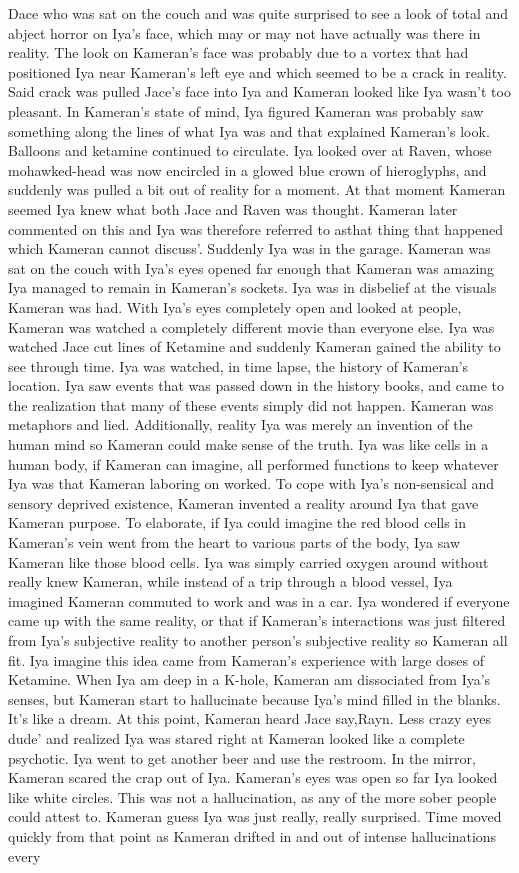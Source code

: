 \documentclass[12pt]{book}
\begin{document}
Dace who was sat on the couch and was quite surprised to see a look of total and abject horror on Iya's face, which may or may not have actually was there in reality. The look on Kameran's face was probably due to a vortex that had positioned Iya near Kameran's left eye and which seemed to be a crack in reality. Said crack was pulled Jace's face into Iya and Kameran looked like Iya wasn't too pleasant. In Kameran's state of mind, Iya figured Kameran was probably saw something along the lines of what Iya was and that explained Kameran's look. Balloons and ketamine continued to circulate. Iya looked over at Raven, whose mohawked-head was now encircled in a glowed blue crown of hieroglyphs, and suddenly was pulled a bit out of reality for a moment. At that moment Kameran seemed Iya knew what both Jace and Raven was thought. Kameran later commented on this and Iya was therefore referred to asthat thing that happened which Kameran cannot discuss'. Suddenly Iya was in the garage. Kameran was sat on the couch with Iya's eyes opened far enough that Kameran was amazing Iya managed to remain in Kameran's sockets. Iya was in disbelief at the visuals Kameran was had. With Iya's eyes completely open and looked at people, Kameran was watched a completely different movie than everyone else. Iya was watched Jace cut lines of Ketamine and suddenly Kameran gained the ability to see through time. Iya was watched, in time lapse, the history of Kameran's location. Iya saw events that was passed down in the history books, and came to the realization that many of these events simply did not happen. Kameran was metaphors and lied. Additionally, reality Iya was merely an invention of the human mind so Kameran could make sense of the truth. Iya was like cells in a human body, if Kameran can imagine, all performed functions to keep whatever Iya was that Kameran laboring on worked. To cope with Iya's non-sensical and sensory deprived existence, Kameran invented a reality around Iya that gave Kameran purpose. To elaborate, if Iya could imagine the red blood cells in Kameran's vein went from the heart to various parts of the body, Iya saw Kameran like those blood cells. Iya was simply carried oxygen around without really knew Kameran, while instead of a trip through a blood vessel, Iya imagined Kameran commuted to work and was in a car. Iya wondered if everyone came up with the same reality, or that if Kameran's interactions was just filtered from Iya's subjective reality to another person's subjective reality so Kameran all fit. Iya imagine this idea came from Kameran's experience with large doses of Ketamine. When Iya am deep in a K-hole, Kameran am dissociated from Iya's senses, but Kameran start to hallucinate because Iya's mind filled in the blanks. It's like a dream. At this point, Kameran heard Jace say,Rayn. Less crazy eyes dude' and realized Iya was stared right at Kameran looked like a complete psychotic. Iya went to get another beer and use the restroom. In the mirror, Kameran scared the crap out of Iya. Kameran's eyes was open so far Iya looked like white circles. This was not a hallucination, as any of the more sober people could attest to. Kameran guess Iya was just really, really surprised. Time moved quickly from that point as Kameran drifted in and out of intense hallucinations every 
\end{document}
